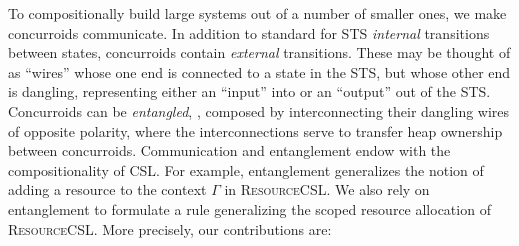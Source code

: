 To compositionally build large systems out of a number of smaller
ones, we make concurroids communicate.
In addition to standard for STS \emph{internal} transitions between
states, concurroids contain \emph{external} transitions. These may be
thought of as ``wires'' whose one end is connected to a state in the
STS, but whose other end is dangling, representing either an ``input''
into or an ``output'' out of the STS. Concurroids can be
\emph{entangled}, \ie, composed by interconnecting their dangling wires
of opposite polarity, where the interconnections serve to transfer heap
ownership between concurroids. Communication and entanglement endow
\SCST with the compositionality of CSL. For example, entanglement
generalizes the notion of adding a resource to the context $\Gamma$ in
\textsc{ResourceCSL}. 
We also rely on entanglement to
formulate a rule generalizing the scoped resource allocation of
\textsc{ResourceCSL}.
%
%
%
More precisely, our contributions are:
